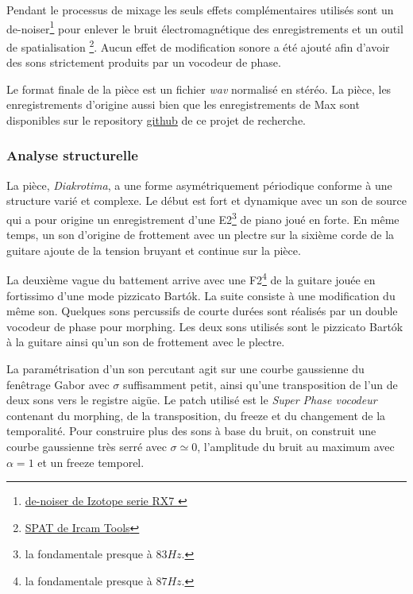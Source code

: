 Pendant le processus de mixage les seuls effets complémentaires utilisés sont un de-noiser\footnote{\href{https://www.izotope.com/en/products/repair-and-edit/rx.html}{de-noiser de Izotope serie RX7 }} pour enlever le bruit électromagnétique des enregistrements et un outil de spatialisation \footnote{\href{http://forumnet.ircam.fr/product/spat-en/}{SPAT de Ircam Tools}}. Aucun effet de modification sonore a été ajouté afin d'avoir des sons strictement produits par un vocodeur de phase.

Le format finale de la pièce est un fichier \textit{wav} normalisé en stéréo. La pièce, les enregistrements d'origine aussi bien que les enregistrements de Max sont disponibles sur le repository \href{https://github.com/melkisedeath/Memoire-du-Master-Paris8---Domaines-fondtionnels-du-vocodeur-de-phase}{github} de ce projet de recherche. 

\subsubsection{Analyse structurelle}

La pièce, \textit{Diakrotima}, a une forme asymétriquement périodique conforme à une structure varié et complexe. Le début est fort et dynamique avec un son de source qui a pour origine un enregistrement d'une E2\footnote{la fondamentale presque à $83 Hz$.} de piano joué en forte. En même temps, un son d'origine de frottement avec un plectre sur la sixième corde de la guitare ajoute de la tension bruyant et continue sur la pièce.

La deuxième vague du battement arrive avec une F2\footnote{la fondamentale presque à $87 Hz$.} de la guitare jouée en fortissimo d'une mode pizzicato Bartók. La suite consiste à une modification du même son. Quelques sons percussifs de courte durées sont réalisés par un double vocodeur de phase pour morphing. Les deux sons utilisés sont le pizzicato Bartók à la guitare ainsi qu'un son de frottement avec le plectre. 

La paramétrisation d'un son percutant agit sur une courbe gaussienne du fenêtrage Gabor avec $\sigma$ suffisamment petit, ainsi qu'une transposition de l'un de deux sons vers le registre aigüe. Le patch utilisé est le \textit{Super Phase vocodeur} contenant du morphing, de la transposition, du freeze et du changement de la temporalité. Pour construire plus des sons à base du bruit, on construit une courbe gaussienne très serré avec $\sigma \simeq 0$, l'amplitude du bruit au maximum avec $\alpha = 1$ et un freeze temporel.

